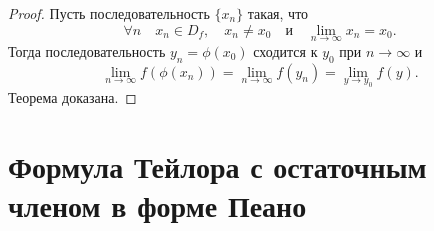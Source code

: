 \begin{proof}
Пусть последовательность $\{ x_n \}$ такая, что 
$$
\forall n \quad x_n \in D_f, \quad x_n \not= x_0 \quad \text{и} \quad \lim_{n \to \infty} x_n = x_0.
$$
Тогда последовательность $y_n = \phi(x_0)$ сходится к $y_0$ при $n \to \infty$ и 
$$
\lim_{n \to \infty} f(\phi(x_n)) = \lim_{n \to \infty} f(y_n) = \lim_{y \to y_0} f(y).
$$
Теорема доказана.
\end{proof}

\section{Формула Тейлора с остаточным членом в форме Пеано}